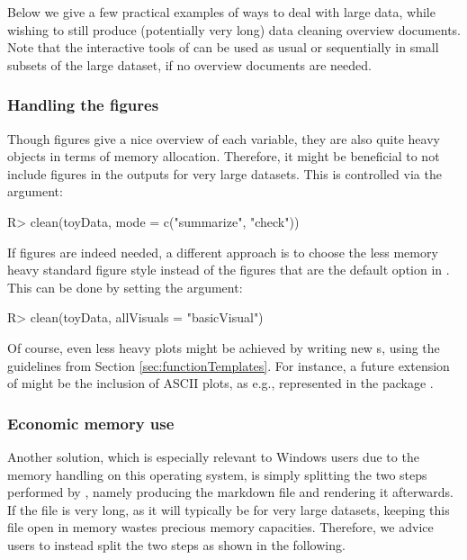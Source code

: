 \documentclass[article,shortnames]{jss}
\newcommand{\hl}[1]{\textcolor{magenta}{#1}}
\begin{document}
Below we give a few practical examples of ways to deal with large
data, while wishing to still produce (potentially very long) data
cleaning overview documents. Note that the interactive tools of
 can be used as usual or sequentially in small subsets
of the large dataset, if no overview documents are needed.

\subsubsection{Handling the figures}
Though figures give a nice overview of each variable, they are also
quite heavy objects in terms of memory allocation. Therefore, it might
be beneficial to not include figures in the  outputs for
very large datasets. This is controlled via the  argument:

\begin{Schunk}
\begin{Sinput}
R> clean(toyData, mode = c("summarize", "check"))
\end{Sinput}
\end{Schunk}

If figures are indeed needed, a different approach is to choose the
less memory heavy standard  figure style instead of the
 figures that are the default option in . This
can be done by setting the  argument:

\begin{Schunk}
\begin{Sinput}
R> clean(toyData, allVisuals = "basicVisual")
\end{Sinput}
\end{Schunk}

Of course, even less heavy plots might be achieved by writing new
s, using the guidelines from Section
\ref{sec:functionTemplates}. For instance, a future extension of
 might be the inclusion of ASCII plots, as
e.g., represented in the  package  \citep{txtplot}.


\subsubsection{Economic memory use}
Another solution, which is
especially relevant to Windows users due to %
the memory handling on this operating system,
is simply splitting the two steps performed
by , namely producing the  markdown file and rendering it
afterwards. If the  file is very long, as it will
typically be for very large datasets, keeping this file open in memory
wastes precious memory capacities. Therefore, we advice users to
instead split the two steps as shown in the following.
\end{document}
